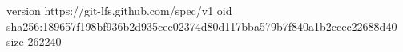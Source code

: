 version https://git-lfs.github.com/spec/v1
oid sha256:189657f198bf936b2d935cee02374d80d117bba579b7f840a1b2cccc22688d40
size 262240
